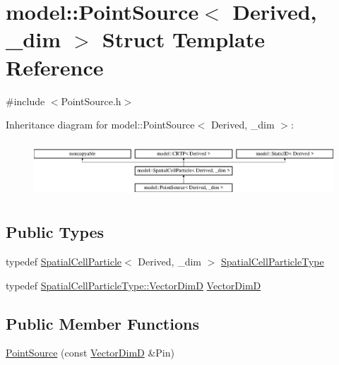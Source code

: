 \hypertarget{structmodel_1_1_point_source_3_01_derived_00_01__dim_01_4}{}\section{model\+:\+:Point\+Source$<$ Derived, \+\_\+dim $>$ Struct Template Reference}
\label{structmodel_1_1_point_source_3_01_derived_00_01__dim_01_4}


{\ttfamily \#include $<$Point\+Source.\+h$>$}

Inheritance diagram for model\+:\+:Point\+Source$<$ Derived, \+\_\+dim $>$\+:\begin{figure}[H]
\begin{center}
\leavevmode
\includegraphics[height=2.105263cm]{structmodel_1_1_point_source_3_01_derived_00_01__dim_01_4}
\end{center}
\end{figure}
\subsection*{Public Types}
\begin{DoxyCompactItemize}
\item 
typedef \hyperlink{structmodel_1_1_spatial_cell_particle}{Spatial\+Cell\+Particle}$<$ Derived, \+\_\+dim $>$ \hyperlink{structmodel_1_1_point_source_3_01_derived_00_01__dim_01_4_ae1a1968c44182d8ef71790106b047c69}{Spatial\+Cell\+Particle\+Type}
\item 
typedef \hyperlink{structmodel_1_1_spatial_cell_particle_a924d94d0c762c92744fae31f43b920e4}{Spatial\+Cell\+Particle\+Type\+::\+Vector\+Dim\+D} \hyperlink{structmodel_1_1_point_source_3_01_derived_00_01__dim_01_4_ad99dbf80854dcb7b7360d590c9c17191}{Vector\+Dim\+D}
\end{DoxyCompactItemize}
\subsection*{Public Member Functions}
\begin{DoxyCompactItemize}
\item 
\hyperlink{structmodel_1_1_point_source_3_01_derived_00_01__dim_01_4_a7a7bd64f75d53cca13b3d613e71a7709}{Point\+Source} (const \hyperlink{structmodel_1_1_point_source_3_01_derived_00_01__dim_01_4_ad99dbf80854dcb7b7360d590c9c17191}{Vector\+Dim\+D} \&Pin)
\end{DoxyCompactItemize}
